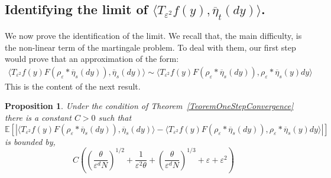 \documentclass[a4paper,12pt]{article}
\newtheorem{proposition}[theorem]{Proposition}
\newcommand{\EE}{\mathbb{E}}
\newcommand{\1}{{\bf {1}}}
\def\epsilon{\varepsilon}
\begin{document}
\subsection{Identifying the limit of $\langle T_{\epsilon^2} f(y), \overline{\eta}_t (dy) \rangle$.}
We now prove the identification of the limit. We recall that, the main difficulty, is the non-linear term of the martingale problem. To deal with them, our first step would prove that an approximation of the form:
\begin{align*}
\langle T_{\epsilon^2} f(y) F(\rho_\epsilon *\overline{\eta}_s(dy)), \overline{\eta}_s(dy) \rangle \sim \langle T_{\epsilon^2} f(y) F(\rho_\epsilon * \overline{\eta}_s(dy)), \rho_\epsilon * \overline{\eta}_s(y) dy \rangle
\end{align*}
This is the content of the next result.
\begin{proposition} \label{CuadraticApprox}
Under the condition of Theorem~\ref{TeoremOneStepConvergence} there is a constant $C>0$ such that
\begin{equation*}
\EE[|\langle T_{\epsilon^2} f(y) F(\rho_\epsilon *\overline{\eta}_s(dy)), \overline{\eta}_s(dy) \rangle - \langle T_{\epsilon^2} f(y) F(\rho_\epsilon * \overline{\eta}_s(dy)), \rho_\epsilon * \overline{\eta}_s(y) dy \rangle|]
\end{equation*}
is bounded by,
\begin{equation*}
C \left( \left(\frac{\theta}{\epsilon^d N}\right)^{1/2} + \frac{1}{\epsilon^2 \theta}+ \left(\frac{\theta}{\epsilon^d N}\right)^{1/3} + \epsilon +  \epsilon^2\right) 
\end{equation*}
\end{proposition}
\end{document}

